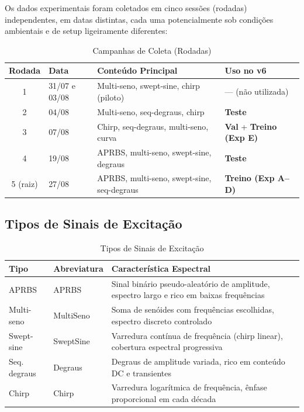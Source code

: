 \documentclass[11pt,a4paper]{article}
\begin{document}
Os dados experimentais foram coletados em cinco sessões (rodadas) independentes, em datas distintas, cada uma potencialmente sob condições ambientais e de setup ligeiramente diferentes:

\begin{table}[hbt!]
\centering
\caption{Campanhas de Coleta (Rodadas)}
\vspace{0.2cm}
\begin{tabular}{clll}
\toprule
\textbf{Rodada} & \textbf{Data} & \textbf{Conteúdo Principal} & \textbf{Uso no v6} \\
\midrule
1 & 31/07 e 03/08 & Multi-seno, swept-sine, chirp (piloto) & --- (não utilizada) \\
2 & 04/08 & Multi-seno, seq-degraus, chirp & \textbf{Teste} \\
3 & 07/08 & Chirp, seq-degraus, multi-seno, curva & \textbf{Val} + \textbf{Treino (Exp E)} \\
4 & 19/08 & APRBS, multi-seno, swept-sine, degraus & \textbf{Teste} \\
5 (raiz) & 27/08 & APRBS, multi-seno, swept-sine, seq-degraus & \textbf{Treino (Exp A--D)} \\
\bottomrule
\end{tabular}
\end{table}

\subsection{Tipos de Sinais de Excitação}

\begin{table}[hbt!]
\centering
\caption{Tipos de Sinais de Excitação}
\vspace{0.2cm}
\begin{tabular}{lp{2cm}p{9.5cm}}
\toprule
\textbf{Tipo} & \textbf{Abreviatura} & \textbf{Característica Espectral} \\
\midrule
APRBS & APRBS & Sinal binário pseudo-aleatório de amplitude, espectro largo e rico em baixas frequências \\
Multi-seno & MultiSeno & Soma de senóides com frequências escolhidas, espectro discreto controlado \\
Swept-sine & SweptSine & Varredura contínua de frequência (chirp linear), cobertura espectral progressiva \\
Seq. degraus & Degraus & Degraus de amplitude variada, rico em conteúdo DC e transientes \\
Chirp & Chirp & Varredura logarítmica de frequência, ênfase proporcional em cada década \\
\bottomrule
\end{tabular}
\end{table}
\end{document}

